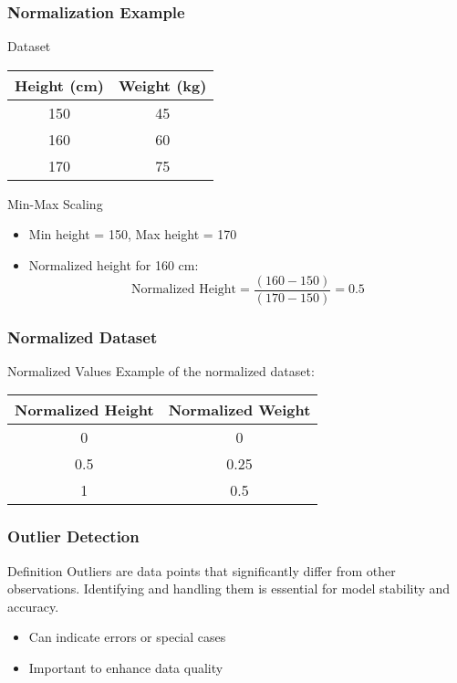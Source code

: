 \documentclass[aspectratio=169]{beamer}
\begin{document}
\begin{frame}[fragile]
    \frametitle{Normalization Example}
    \begin{block}{Dataset}
        \begin{tabular}{|c|c|}
            \hline
            Height (cm) & Weight (kg) \\
            \hline
            150 & 45 \\
            160 & 60 \\
            170 & 75 \\
            \hline
        \end{tabular}
    \end{block}
    \begin{block}{Min-Max Scaling}
        \begin{itemize}
            \item Min height = 150, Max height = 170
            \item Normalized height for 160 cm:
            \begin{equation}
                \text{Normalized Height} = \frac{(160 - 150)}{(170 - 150)} = 0.5
            \end{equation}
        \end{itemize}
    \end{block}
\end{frame}

\begin{frame}[fragile]
    \frametitle{Normalized Dataset}
    \begin{block}{Normalized Values}
        Example of the normalized dataset:
        \begin{tabular}{|c|c|}
            \hline
            Normalized Height & Normalized Weight \\
            \hline
            0 & 0 \\
            0.5 & 0.25 \\
            1 & 0.5 \\
            \hline
        \end{tabular}
    \end{block}
\end{frame}

\begin{frame}[fragile]
    \frametitle{Outlier Detection}
    \begin{block}{Definition}
        Outliers are data points that significantly differ from other observations. Identifying and handling them is essential for model stability and accuracy.
    \end{block}
    \begin{itemize}
        \item Can indicate errors or special cases
        \item Important to enhance data quality
    \end{itemize}
\end{frame}
\end{document}
